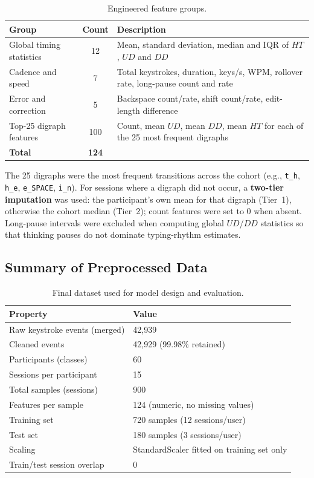 \begin{table}[H]
\centering
\caption{Engineered feature groups.}
\begin{tabular}{@{}lcp{8.3cm}@{}}
\toprule
\textbf{Group} & \textbf{Count} & \textbf{Description} \\ \midrule
Global timing statistics & 12 & Mean, standard deviation, median and IQR of $HT$, $UD$ and $DD$ \\
Cadence and speed & 7 & Total keystrokes, duration, keys/s, WPM, rollover rate, long-pause count and rate \\
Error and correction & 5 & Backspace count/rate, shift count/rate, edit-length difference \\
Top-25 digraph features & 100 & Count, mean $UD$, mean $DD$, mean $HT$ for each of the 25 most frequent digraphs \\ \midrule
\textbf{Total} & \textbf{124} & \\ \bottomrule
\end{tabular}
\end{table}

The 25 digraphs were the most frequent transitions across the cohort (e.g., \texttt{t\_h}, \texttt{h\_e}, \texttt{e\_SPACE}, \texttt{i\_n}). For sessions where a digraph did not occur, a \textbf{two-tier imputation} was used: the participant's own mean for that digraph (Tier~1), otherwise the cohort median (Tier~2); count features were set to 0 when absent. Long-pause intervals were excluded when computing global $UD$/$DD$ statistics so that thinking pauses do not dominate typing-rhythm estimates.

\subsection{Summary of Preprocessed Data}
\label{subsec:summary}
\begin{table}[H]
\centering
\caption{Final dataset used for model design and evaluation.}
\begin{tabular}{@{}ll@{}}
\toprule
\textbf{Property} & \textbf{Value} \\ \midrule
Raw keystroke events (merged) & 42{,}939 \\
Cleaned events & 42{,}929 (99.98\% retained) \\
Participants (classes) & 60 \\
Sessions per participant & 15 \\
Total samples (sessions) & 900 \\
Features per sample & 124 (numeric, no missing values) \\
Training set & 720 samples (12 sessions/user) \\
Test set & 180 samples (3 sessions/user) \\
Scaling & StandardScaler fitted on training set only \\
Train/test session overlap & 0 \\ \bottomrule
\end{tabular}
\end{table}

